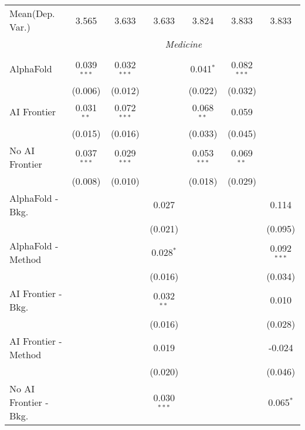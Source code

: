 \begin{tabular}{lcccccc}
Mean(Dep. Var.) & 3.565 & 3.633 & 3.633 & 3.824 & 3.833 & 3.833 \\
 & \multicolumn{6}{c}{\textit{Medicine}} \\ \\
   AlphaFold               & 0.039$^{***}$ & 0.032$^{***}$ &               & 0.041$^{*}$   & 0.082$^{***}$ &   \\   
                           & (0.006)       & (0.012)       &               & (0.022)       & (0.032)       &   \\   
   AI Frontier             & 0.031$^{**}$  & 0.072$^{***}$ &               & 0.068$^{**}$  & 0.059         &   \\   
                           & (0.015)       & (0.016)       &               & (0.033)       & (0.045)       &   \\   
   No AI Frontier          & 0.037$^{***}$ & 0.029$^{***}$ &               & 0.053$^{***}$ & 0.069$^{**}$  &   \\   
                           & (0.008)       & (0.010)       &               & (0.018)       & (0.029)       &   \\   
   AlphaFold - Bkg.        &               &               & 0.027         &               &               & 0.114\\   
                           &               &               & (0.021)       &               &               & (0.095)\\   
   AlphaFold - Method      &               &               & 0.028$^{*}$   &               &               & 0.092$^{***}$\\   
                           &               &               & (0.016)       &               &               & (0.034)\\   
   AI Frontier - Bkg.      &               &               & 0.032$^{**}$  &               &               & 0.010\\   
                           &               &               & (0.016)       &               &               & (0.028)\\   
   AI Frontier - Method    &               &               & 0.019         &               &               & -0.024\\   
                           &               &               & (0.020)       &               &               & (0.046)\\   
   No AI Frontier - Bkg.   &               &               & 0.030$^{***}$ &               &               & 0.065$^{*}$\\   

\end{tabular}
